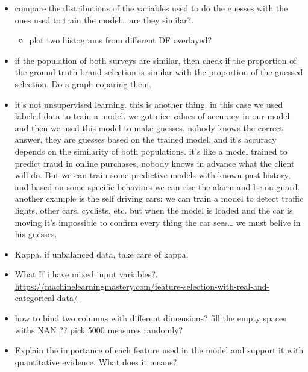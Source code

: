 \documentclass[
]{article}
\providecommand{\tightlist}{%
  \setlength{\itemsep}{0pt}\setlength{\parskip}{0pt}}
\begin{document}
\begin{itemize}
\item
  compare the distributions of the variables used to do the guesses with
  the ones used to train the model\ldots{} are they similar?.

  \begin{itemize}
  \tightlist
  \item
    plot two histograms from different DF overlayed?
  \end{itemize}
\item
  if the population of both surveys are similar, then check if the
  proportion of the ground truth brand selection is similar with the
  proportion of the guessed selection. Do a graph coparing them.
\item
  it's not unsupervised learning. this is another thing. in this case we
  used labeled data to train a model. we got nice values of accuracy in
  our model and then we used this model to make guesses. nobody knows
  the correct answer, they are guesses based on the trained model, and
  it's accuracy depends on the similarity of both populations. it's like
  a model trained to predict fraud in online purchases, nobody knows in
  advance what the client will do. But we can train some predictive
  models with known past history, and based on some specific behaviors
  we can rise the alarm and be on guard. another example is the self
  driving cars: we can train a model to detect traffic lights, other
  cars, cyclists, etc. but when the model is loaded and the car is
  moving it's impossible to confirm every thing the car sees\ldots{} we
  must belive in his guesses.
\item
  Kappa. if unbalanced data, take care of kappa.
\item
  What If i have mixed input variables?.
  \url{https://machinelearningmastery.com/feature-selection-with-real-and-categorical-data/}
\item
  how to bind two columns with different dimensions? fill the empty
  spaces withs NAN ?? pick 5000 measures randomly?
\item
  Explain the importance of each feature used in the model and support
  it with quantitative evidence. What does it means?
\end{itemize}
\end{document}
